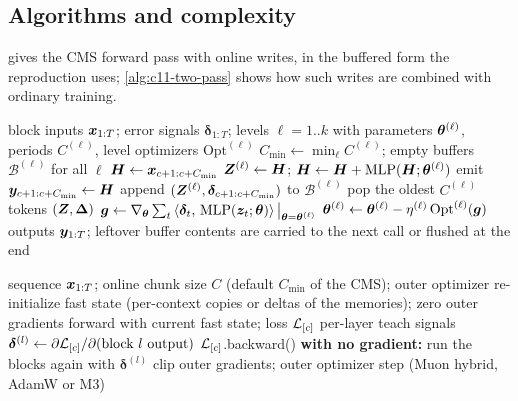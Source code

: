 \subsection{Algorithms and complexity}\label{sec:c11-nl-alg}

 gives the CMS forward pass with online writes, in the buffered form the
reproduction uses; \cref{alg:c11-two-pass} shows how such writes are combined with ordinary
training.

\begin{algorithm}[t]
\caption{CMS forward pass with online multi-frequency writes (one sequence).}\label{alg:c11-cms}
\begin{algorithmic}[1]
\Require block inputs $\bm{x}_{1:T}$; error signals $\bm{\delta}_{1:T}$; levels $\ell = 1..k$ with
parameters $\bm{\theta}^{(\ell)}$, periods $C^{(\ell)}$, level optimizers $\mathrm{Opt}^{(\ell)}$
\State $C_{\min} \gets \min_\ell C^{(\ell)}$; empty buffers $\mathcal{B}^{(\ell)}$ for all $\ell$
  \State $\bm{H} \gets \bm{x}_{c+1:c+C_{\min}}$
   
    \State $\bm{Z}^{(\ell)} \gets \bm{H}$; \quad $\bm{H} \gets \bm{H} + \mathrm{MLP}(\bm{H};\bm{\theta}^{(\ell)})$
  \EndFor
  \State emit $\bm{y}_{c+1:c+C_{\min}} \gets \bm{H}$
   
    \State append $(\bm{Z}^{(\ell)}, \bm{\delta}_{c+1:c+C_{\min}})$ to $\mathcal{B}^{(\ell)}$
      \State pop the oldest $C^{(\ell)}$ tokens $(\bm{Z}, \bm{\Delta})$
      \State $\bm{g} \gets \nabla_{\bm{\theta}}\sum_t\left\langle \bm{\delta}_t,\, \mathrm{MLP}(\bm{z}_t;\bm{\theta})\right\rangle\big|_{\bm{\theta} = \bm{\theta}^{(\ell)}}$ 
      \State $\bm{\theta}^{(\ell)} \gets \bm{\theta}^{(\ell)} - \eta^{(\ell)}\,\mathrm{Opt}^{(\ell)}(\bm{g})$
    \EndWhile
  \EndFor
\EndFor
\Ensure outputs $\bm{y}_{1:T}$; leftover buffer contents are carried to the next call or flushed at the end
\end{algorithmic}
\end{algorithm}

\begin{algorithm}[t]
\caption{One outer training step with stop-gradient online writes (the reproduction's default \texttt{two\_pass\_stopgrad\_updates}).}\label{alg:c11-two-pass}
\begin{algorithmic}[1]
\Require sequence $\bm{x}_{1:T}$; online chunk size $C$ (default $C_{\min}$ of the CMS); outer optimizer
\State re-initialize fast state (per-context copies or deltas of the memories); zero outer gradients
  \State forward with current fast state; loss $\mathcal{L}_{[c]}$ 
  \State per-layer teach signals $\bm{\delta}^{(l)} \gets \partial\mathcal{L}_{[c]}/\partial(\text{block } l \text{ output})$
  \State $\mathcal{L}_{[c]}$.backward() 
  \State \textbf{with no gradient:} run the blocks again with $\bm{\delta}^{(l)}$ 
\EndFor
\State clip outer gradients; outer optimizer step (Muon hybrid, AdamW or M3)
\end{algorithmic}
\end{algorithm}


